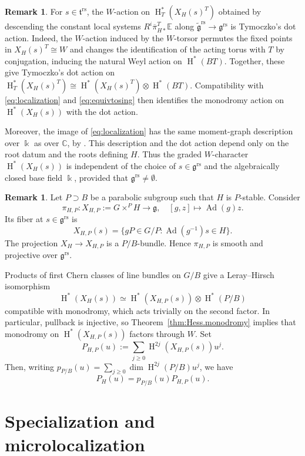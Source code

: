 \documentclass[11pt]{amsart}
\numberwithin{equation}{section}
\theoremstyle{definition}
\newtheorem{remark}[theorem]{Remark}
\newcommand\grs{\mathfrak{g}^{\mathrm{rs}}}
\newcommand\tgrs{\widetilde{\mathfrak{g}}^{\mathrm{rs}}}
\newcommand\rs{{\mathrm{rs}}}
\def\lra{\longrightarrow }
\def\beq{\begin{equation}}
\def\eeq{\end{equation}}
\DeclareMathOperator{\Ad}{\mathrm{Ad}}
\DeclareMathOperator{\coh}{\mathrm{H}}
\def\C{\mathbb{C}}
\def\EE{\mathbb{E}}
\def\fg{\mathfrak {g}}
\def\ft{\mathfrak {t}}
\begin{document}
\begin{remark}\label{rem:Hess.dot.action}
For $s\in\ft^\rs$, the $W$-action on $\coh_T^*(X_H(s)^T)$ obtained by descending the constant local systems $R^i\overline\pi_{H*}^T\EE$ along $\tgrs\to\grs$ is Tymoczko's dot action.
Indeed, the $W$-action induced by the $W$-torsor permutes the fixed points in $X_H(s)^T\cong W$ and changes the identification of the acting torus with $T$ by conjugation, inducing the natural Weyl action on $\coh^*(BT)$.
Together, these give Tymoczko's dot action on $\coh_T^*(X_H(s)^T)\cong \coh^*(X_H(s)^T)\otimes \coh^*(BT)$.
Compatibility with \eqref{eq:localization} and \eqref{eq:equivtosing} then identifies the monodromy action on $\coh^*(X_H(s))$ with the dot action.

Moreover, the image of \eqref{eq:localization} has the same moment-graph description over $\Bbbk$ as over $\C$, by \cite[Lemme~3.1]{chaudouard-laumon}.
This description and the dot action depend only on the root datum and the roots defining $H$.
Thus the graded $W$-character $\coh^*(X_H(s))$ is independent of the choice of $s\in\grs$ and the algebraically closed base field $\Bbbk$, provided that $\grs\neq\emptyset$.
\end{remark}

\begin{remark}\label{rem:partial.Hess}
Let $P\supset B$ be a parabolic subgroup such that $H$ is $P$-stable. Consider
\[
\pi_{H,P}:X_{H,P}:=G\times^P H\lra\fg,\quad [g,z]\mapsto\Ad(g)z.
\]
Its fiber at $s\in\grs$ is
\[
X_{H,P}(s)=\{gP\in G/P:\Ad(g^{-1})s\in H\}.
\]
The projection $X_H\to X_{H,P}$ is a
$P/B$-bundle. Hence $\pi_{H,P}$ is smooth and projective
over $\grs$.

Products of first Chern classes of line bundles on $G/B$
give a Leray--Hirsch isomorphism
\[
\coh^*(X_H(s))
\simeq
\coh^*(X_{H,P}(s))\otimes\coh^*(P/B)
\]
compatible with monodromy, which acts trivially on the
second factor.
In particular, pullback is injective, so
Theorem~\ref{thm:Hess.monodromy} implies that monodromy on
$\coh^*(X_{H,P}(s))$ factors through $W$.
Set
\[
P_{H,P}(u):=
\sum_{j\geq0}\coh^{2j}(X_{H,P}(s))u^j.
\]
Then, writing $p_{P/B}(u)= \sum_{j\geq0}\dim\coh^{2j}(P/B)u^j$, we have
\beq\label{eq:flagbundle}
P_H(u)=p_{P/B}(u)P_{H,P}(u).
\eeq
\end{remark}


\section{Specialization and microlocalization}\label{s:microloc}
\end{document}
